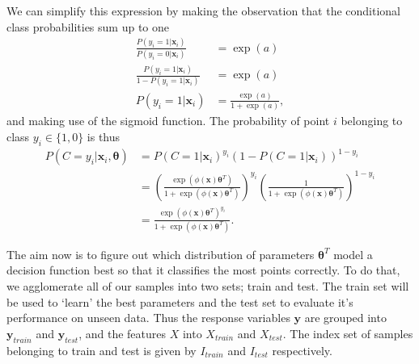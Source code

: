   We can simplify this expression by making the observation that the conditional class probabilities sum up to one
  \begin{align}
	\frac{P(y_i=1 |  \mathbf{x}_i)}{P(y_i = 0 |  \mathbf{x}_i)} &= \exp(a)\\
	\frac{P(y_i=1 |  \mathbf{x}_i)}{1-P(y_i=1 |  \mathbf{x}_i)} &= \exp(a)\\
	P(y_i=1 |  \mathbf{x}_i) &= \frac{\exp(a)}{1+\exp(a)},
  \end{align}
  and making use of the sigmoid function. The probability of point $i$ belonging to class $y_i \in \{1,0\}$  is thus
    \begin{align}
  	P(C = y_i |  \mathbf{x}_i, \bm{\theta}) &= P(C=1 |  \mathbf{x}_i)^{y_i}(1-P(C=1 |  \mathbf{x}_i))^{1-y_i}\\
  	\label{eq:bernoulilikelihood}
	&= \left(\frac{\exp(\phi( \mathbf{x}) \bm{\theta}^T)}{1+\exp(\phi( \mathbf{x}) \bm{\theta}^T)}\right)^{y_i}\left(\frac{1}{1+\exp(\phi( \mathbf{x}) \bm{\theta}^T)}\right)^{1-y_i} \\
	&=\frac{\exp(\phi( \mathbf{x}) \bm{\theta}^T)^{y_i}}{1+\exp(\phi( \mathbf{x}) \bm{\theta}^T)}.
  \end{align}

  
  
  The aim now is to figure out which distribution of parameters $ \bm{\theta}^T$ model a decision function best so that it classifies the most points correctly. To do that, we agglomerate all of our samples into two sets; train and test. The train set will be used to `learn' the best parameters and the test set to evaluate it's performance on unseen data. Thus the response variables $\mathbf{y}$ are grouped into $ \mathbf{y}_{train}$ and $ \mathbf{y}_{test} $, and the features $X$ into ${X}_{train}$ and $X_{test}$. The index set of samples belonging to train and test is given by $I_{train}$ and $I_{test}$ respectively.
  
